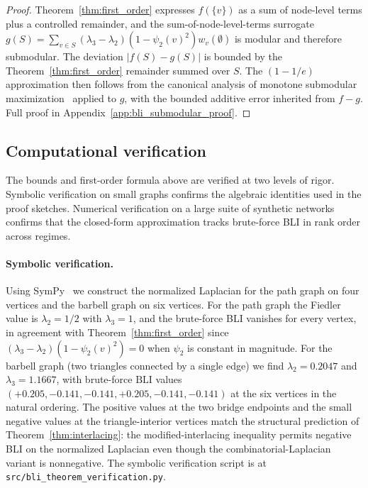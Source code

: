 \documentclass[12pt, a4paper]{article}
\begin{document}
\begin{proof}
Theorem~\ref{thm:first_order} expresses $f(\{v\})$ as a sum of node-level terms plus a controlled remainder, and the sum-of-node-level-terms surrogate $g(S) = \sum_{v \in S} (\lambda_3 - \lambda_2)(1 - \psi_2(v)^2) w_v(\emptyset)$ is modular and therefore submodular. The deviation $\lvert f(S) - g(S) \rvert$ is bounded by the Theorem~\ref{thm:first_order} remainder summed over $S$. The $(1 - 1/e)$ approximation then follows from the canonical analysis of monotone submodular maximization~\citep{nemhauser1978analysis} applied to $g$, with the bounded additive error inherited from $f - g$. Full proof in Appendix~\ref{app:bli_submodular_proof}.
\end{proof}

\subsection{Computational verification}\label{subsec:bli_verification}

The bounds and first-order formula above are verified at two levels of rigor. Symbolic verification on small graphs confirms the algebraic identities used in the proof sketches. Numerical verification on a large suite of synthetic networks confirms that the closed-form approximation tracks brute-force BLI in rank order across regimes.

\paragraph{Symbolic verification.} Using SymPy~\citep{meurer2017sympy} we construct the normalized Laplacian for the path graph on four vertices and the barbell graph on six vertices. For the path graph the Fiedler value is $\lambda_2 = 1/2$ with $\lambda_3 = 1$, and the brute-force BLI vanishes for every vertex, in agreement with Theorem~\ref{thm:first_order} since $(\lambda_3 - \lambda_2)(1 - \psi_2(v)^2) = 0$ when $\psi_2$ is constant in magnitude. For the barbell graph (two triangles connected by a single edge) we find $\lambda_2 = 0.2047$ and $\lambda_3 = 1.1667$, with brute-force $\mathrm{BLI}$ values $(+0.205, -0.141, -0.141, +0.205, -0.141, -0.141)$ at the six vertices in the natural ordering. The positive values at the two bridge endpoints and the small negative values at the triangle-interior vertices match the structural prediction of Theorem~\ref{thm:interlacing}: the modified-interlacing inequality permits negative BLI on the normalized Laplacian even though the combinatorial-Laplacian variant is nonnegative. The symbolic verification script is at \texttt{src/bli\_theorem\_verification.py}.
\end{document}
